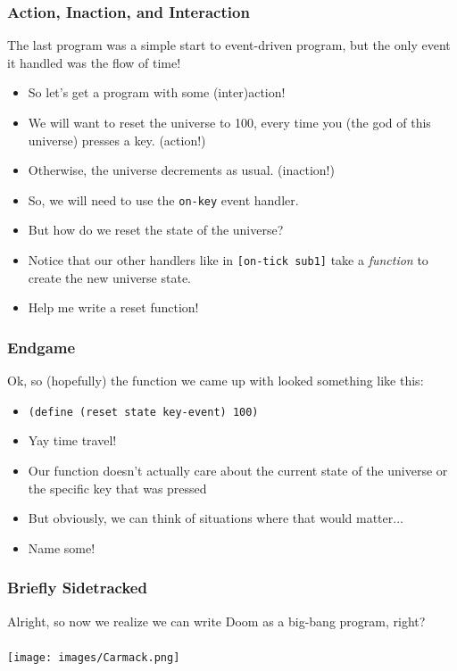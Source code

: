 \documentclass{beamer}
\begin{document}
\begin{frame}
  \frametitle{Action, Inaction, and Interaction}
  The last program was a simple start to event-driven program, but the only
  event it handled was the flow of time!
  \begin{itemize}
  \item<2-> So let's get a program with some (inter)action!
  \item<3-> We will want to reset the universe to 100, every time you (the god of this universe) presses a key. (action!)
  \item<4-> Otherwise, the universe decrements as usual. (inaction!)
  \item<5-> So, we will need to use the \texttt{on-key} event handler.
  \item<6-> But how do we reset the state of the universe?
  \item<7-> Notice that our other handlers like in \texttt{[on-tick sub1]} take a \emph{function} to create the new universe state.
  \item<8-> Help me write a reset function!
  \end{itemize}
\end{frame}

\begin{frame}
  \frametitle{Endgame}
  Ok, so (hopefully) the function we came up with looked something like this:
  \begin{itemize}
  \item<2-> \texttt{(define (reset state key-event) 100)}
  \item<3-> Yay time travel!
  \item<4-> Our function doesn't actually care about the current state of the
    universe or the specific key that was pressed
  \item<5-> But obviously, we can think of situations where that would matter...
  \item<6-> Name some!
  \end{itemize}
\end{frame}

\begin{frame}
  \frametitle{Briefly Sidetracked}
  Alright, so now we realize we can write Doom as a big-bang program, right?
  \\\\
  \texttt{[image: images/Carmack.png]}
\end{frame}
\end{document}
